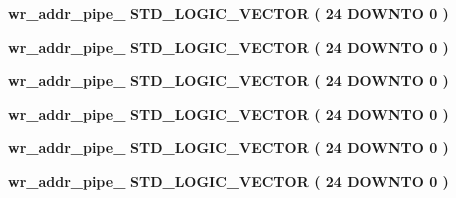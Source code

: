 \begin{DoxyCompactItemize}
\item 
{\bf wr\+\_\+addr\+\_\+pipe\+\_} {\bfseries \textcolor{comment}{S\+T\+D\+\_\+\+L\+O\+G\+I\+C\+\_\+\+V\+E\+C\+T\+OR}\textcolor{vhdlchar}{ }\textcolor{vhdlchar}{(}\textcolor{vhdlchar}{ }\textcolor{vhdlchar}{ } \textcolor{vhdldigit}{24} \textcolor{vhdlchar}{ }\textcolor{keywordflow}{D\+O\+W\+N\+TO}\textcolor{vhdlchar}{ }\textcolor{vhdlchar}{ } \textcolor{vhdldigit}{0} \textcolor{vhdlchar}{ }\textcolor{vhdlchar}{)}\textcolor{vhdlchar}{ }} 
\item 
{\bf wr\+\_\+addr\+\_\+pipe\+\_} {\bfseries \textcolor{comment}{S\+T\+D\+\_\+\+L\+O\+G\+I\+C\+\_\+\+V\+E\+C\+T\+OR}\textcolor{vhdlchar}{ }\textcolor{vhdlchar}{(}\textcolor{vhdlchar}{ }\textcolor{vhdlchar}{ } \textcolor{vhdldigit}{24} \textcolor{vhdlchar}{ }\textcolor{keywordflow}{D\+O\+W\+N\+TO}\textcolor{vhdlchar}{ }\textcolor{vhdlchar}{ } \textcolor{vhdldigit}{0} \textcolor{vhdlchar}{ }\textcolor{vhdlchar}{)}\textcolor{vhdlchar}{ }} 
\item 
{\bf wr\+\_\+addr\+\_\+pipe\+\_} {\bfseries \textcolor{comment}{S\+T\+D\+\_\+\+L\+O\+G\+I\+C\+\_\+\+V\+E\+C\+T\+OR}\textcolor{vhdlchar}{ }\textcolor{vhdlchar}{(}\textcolor{vhdlchar}{ }\textcolor{vhdlchar}{ } \textcolor{vhdldigit}{24} \textcolor{vhdlchar}{ }\textcolor{keywordflow}{D\+O\+W\+N\+TO}\textcolor{vhdlchar}{ }\textcolor{vhdlchar}{ } \textcolor{vhdldigit}{0} \textcolor{vhdlchar}{ }\textcolor{vhdlchar}{)}\textcolor{vhdlchar}{ }} 
\item 
{\bf wr\+\_\+addr\+\_\+pipe\+\_} {\bfseries \textcolor{comment}{S\+T\+D\+\_\+\+L\+O\+G\+I\+C\+\_\+\+V\+E\+C\+T\+OR}\textcolor{vhdlchar}{ }\textcolor{vhdlchar}{(}\textcolor{vhdlchar}{ }\textcolor{vhdlchar}{ } \textcolor{vhdldigit}{24} \textcolor{vhdlchar}{ }\textcolor{keywordflow}{D\+O\+W\+N\+TO}\textcolor{vhdlchar}{ }\textcolor{vhdlchar}{ } \textcolor{vhdldigit}{0} \textcolor{vhdlchar}{ }\textcolor{vhdlchar}{)}\textcolor{vhdlchar}{ }} 
\item 
{\bf wr\+\_\+addr\+\_\+pipe\+\_} {\bfseries \textcolor{comment}{S\+T\+D\+\_\+\+L\+O\+G\+I\+C\+\_\+\+V\+E\+C\+T\+OR}\textcolor{vhdlchar}{ }\textcolor{vhdlchar}{(}\textcolor{vhdlchar}{ }\textcolor{vhdlchar}{ } \textcolor{vhdldigit}{24} \textcolor{vhdlchar}{ }\textcolor{keywordflow}{D\+O\+W\+N\+TO}\textcolor{vhdlchar}{ }\textcolor{vhdlchar}{ } \textcolor{vhdldigit}{0} \textcolor{vhdlchar}{ }\textcolor{vhdlchar}{)}\textcolor{vhdlchar}{ }} 
\item 
{\bf wr\+\_\+addr\+\_\+pipe\+\_} {\bfseries \textcolor{comment}{S\+T\+D\+\_\+\+L\+O\+G\+I\+C\+\_\+\+V\+E\+C\+T\+OR}\textcolor{vhdlchar}{ }\textcolor{vhdlchar}{(}\textcolor{vhdlchar}{ }\textcolor{vhdlchar}{ } \textcolor{vhdldigit}{24} \textcolor{vhdlchar}{ }\textcolor{keywordflow}{D\+O\+W\+N\+TO}\textcolor{vhdlchar}{ }\textcolor{vhdlchar}{ } \textcolor{vhdldigit}{0} \textcolor{vhdlchar}{ }\textcolor{vhdlchar}{)}\textcolor{vhdlchar}{ }} 

\end{DoxyCompactItemize}
